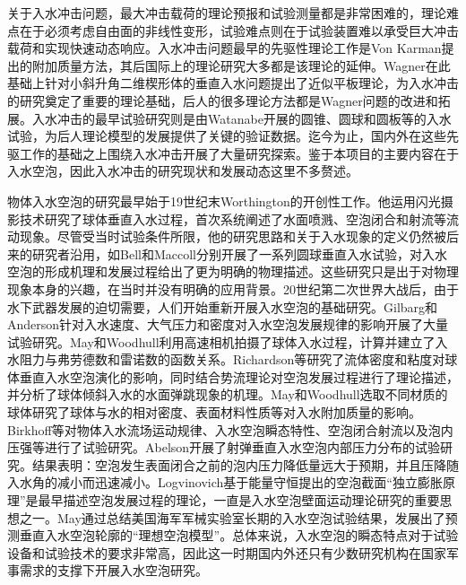 关于入水冲击问题，最大冲击载荷的理论预报和试验测量都是非常困难的，理论难点在于必须考虑自由面的非线性变形，试验难点则在于试验装置难以承受巨大冲击载荷和实现快速动态响应。入水冲击问题最早的先驱性理论工作是Von Karman\cite{von1929impact}提出的附加质量方法，其后国际上的理论研究大多都是该理论的延伸。Wagner\cite{wagner1932phenomena}在此基础上针对小斜升角二维楔形体的垂直入水问题提出了近似平板理论，为入水冲击的研究奠定了重要的理论基础，后人的很多理论方法都是Wagner问题的改进和拓展。入水冲击的最早试验研究则是由Watanabe开展的圆锥、圆球和圆板等的入水试验，为后人理论模型的发展提供了关键的验证数据。迄今为止，国内外在这些先驱工作的基础之上围绕入水冲击开展了大量研究探索\cite{sedov1934impact, yu1945virtual, shiffman1945force, courant1945force, shiffman1951force, hillman1946vertical, pierson1950penetration, monaghan1949theoretical, bisplinghoff1952some, fabula1957ellipse, trilling1950impact, schnitzer1953estimation, faltinsen1998water, cointe1989two, miloh1991oblique, miloh1991initial, howison1991incompressible, zhao1993water, lin1994water, anghileri1995experimental, mei1999water, park2003numerical, chen1990, gu1991, 郑际嘉1992刚性圆板自由落体在水面上的冲击压力, 钱勤1994任意的拉格朗日欧拉边界元, lu1998nonlinear, 张军2003楔形体入水初期流场的数值模拟, 张于维2010二维楔形体砰击载荷研究}。鉴于本项目的主要内容在于入水空泡，因此入水冲击的研究现状和发展动态这里不多赘述。

物体入水空泡的研究最早始于19世纪末Worthington的开创性工作。他运用闪光摄影技术研究了球体垂直入水过程，首次系统阐述了水面喷溅、空泡闭合和射流等流动现象。尽管受当时试验条件所限，他的研究思路和关于入水现象的定义仍然被后来的研究者沿用，如Bell和Maccoll\cite{maccoll1928aerodynamics}分别开展了一系列圆球垂直入水试验，对入水空泡的形成机理和发展过程给出了更为明确的物理描述。这些研究只是出于对物理现象本身的兴趣，在当时并没有明确的应用背景。20世纪第二次世界大战后，由于水下武器发展的迫切需要，人们开始重新开展入水空泡的基础研究。Gilbarg和Anderson\cite{gilbarg1948influence}针对入水速度、大气压力和密度对入水空泡发展规律的影响开展了大量试验研究。May和Woodhull\cite{may1948drag}利用高速相机拍摄了球体入水过程，计算并建立了入水阻力与弗劳德数和雷诺数的函数关系。Richardson等\cite{richardson1948impact}研究了流体密度和粘度对球体垂直入水空泡演化的影响，同时结合势流理论对空泡发展过程进行了理论描述，并分析了球体倾斜入水的水面弹跳现象的机理。May和Woodhull\cite{may1950virtual}选取不同材质的球体研究了球体与水的相对密度、表面材料性质等对入水附加质量的影响。Birkhoff等对物体入水流场运动规律、入水空泡瞬态特性、空泡闭合射流以及泡内压强等进行了试验研究。Abelson\cite{abelson1970pressure}开展了射弹垂直入水空泡内部压力分布的试验研究。结果表明：空泡发生表面闭合之前的泡内压力降低量远大于预期，并且压降随入水角的减小而迅速减小。Logvinovich\cite{logvinovich1972hydrodynamics}基于能量守恒提出的空泡截面“独立膨胀原理”是最早描述空泡发展过程的理论，一直是入水空泡壁面运动理论研究的重要思想之一。May\cite{may1970review, may1975water}通过总结美国海军军械实验室长期的入水空泡试验结果，发展出了预测垂直入水空泡轮廓的“理想空泡模型”。总体来说，入水空泡的瞬态特点对于试验设备和试验技术的要求非常高，因此这一时期国内外还只有少数研究机构在国家军事需求的支撑下开展入水空泡研究。

